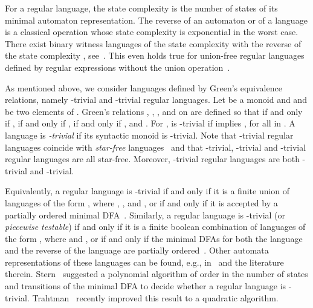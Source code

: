 \documentclass[runningheads]{llncs}
\newcommand{\R}{}
\newcommand{\J}{}
\begin{document}
  For a regular language, the state complexity is the number of states of its minimal automaton representation. The reverse of an automaton or of a language is a classical operation whose state complexity is exponential in the worst case. There exist binary witness languages of the state complexity  with the reverse of the state complexity , see~\cite{le81,yzs94}. This even holds true for union-free regular languages defined by regular expressions without the union operation~\cite{ijfcsJiraskovaM11}.

  As mentioned above, we consider languages defined by Green's equivalence relations, namely \R-trivial and \J-trivial regular languages. Let  be a monoid and  and  be two elements of . Green's relations , \R, \J, and  on  are defined so that
     if and only if ,
     if and only if ,
     if and only if , and
    .
  For ,  is \mbox{-}trivial if  implies , for all  in . A language is {\em \mbox{-}trivial} if its syntactic monoid is -trivial. Note that -trivial regular languages coincide with {\em star-free} languages~\cite[Chapter~11]{lawson2003finite} and that -trivial, \R-trivial and \J-trivial regular languages are all star-free. Moreover, \J-trivial regular languages are both -trivial and \R-trivial.

  Equivalently, a regular language is \R-trivial if and only if it is a finite union of languages of the form , where , , and , or if and only if it is accepted by a partially ordered minimal DFA~\cite{BrzozowskiF80}. Similarly, a regular language is \J-trivial (or {\em piecewise testable}) if and only if it is a finite boolean combination of languages of the form , where  and , or if and only if the minimal DFAs for both the language and the reverse of the language are partially ordered~\cite{Simon1972,Simon1975}. Other automata representations of these languages can be found, e.g., in~\cite{LauserCIAA} and the literature therein. Stern~\cite{Stern85a} suggested a polynomial algorithm 
  of order  in the number of states and transitions of the minimal DFA 
  to decide whether a regular language is \J-trivial. Trahtman~\cite{Trahtman2001} recently improved this result to a quadratic algorithm. 
  
\end{document}
